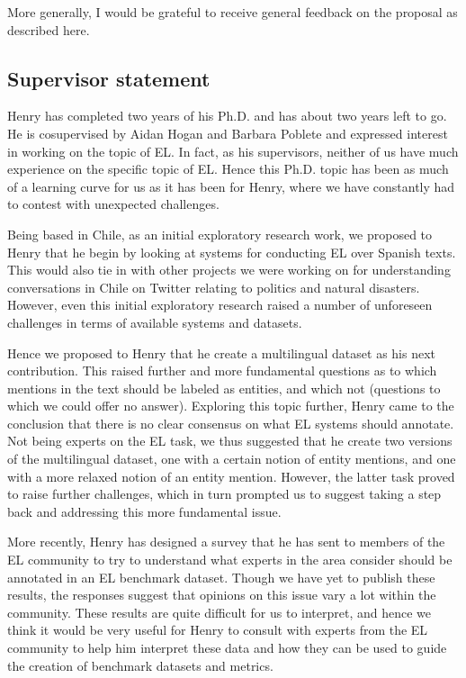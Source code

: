 \documentclass[sigconf]{acmart}
\begin{document}
More generally, I would be grateful to receive general feedback on the proposal as described here.

\balance

\subsection{Supervisor statement}

Henry has completed two years of his Ph.D. and has about two years left to go. He is cosupervised by Aidan Hogan and Barbara Poblete and expressed interest in working on the topic of EL. In fact, as his supervisors, neither of us have much experience on the specific topic of EL. Hence this Ph.D. topic has been as much of a learning curve for us as it has been for Henry, where we have constantly had to contest with unexpected challenges. 

Being based in Chile, as an initial exploratory research work, we proposed to Henry that he begin by looking at systems for conducting EL over Spanish texts. This would also tie in with other projects we were working on for understanding conversations in Chile on Twitter relating to politics and natural disasters. However, even this initial exploratory research raised a number of unforeseen challenges in terms of available systems and datasets. 

Hence we proposed to Henry that he create a multilingual dataset as his next contribution. This raised further and more fundamental questions as to which mentions in the text should be labeled as entities, and which not (questions to which we could offer no answer). Exploring this topic further, Henry came to the conclusion that there is no clear consensus on what EL systems should annotate. Not being experts on the EL task, we thus suggested that he create two versions of the multilingual dataset, one with a certain notion of entity mentions, and one with a more relaxed notion of an entity mention. However, the latter task proved to raise further challenges, which in turn prompted us to suggest taking a step back and addressing this more fundamental issue.

More recently, Henry has designed a survey that he has sent to members of the EL community to try to understand what experts in the area consider should be annotated in an EL benchmark dataset. Though we have yet to publish these results, the responses suggest that opinions on this issue vary a lot within the community. These results are quite difficult for us to interpret, and hence we think it would be very useful for Henry to consult with experts from the EL community to help him interpret these data and how they can be used to guide the creation of benchmark datasets and metrics.
\end{document}
